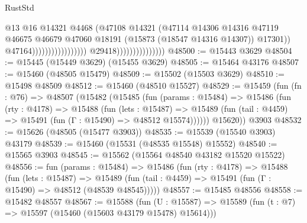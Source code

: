 \begin{lexlean}{RustStd}
\begin{coremodule}
                                                                    @13
                                                                    @16
                                                                    @14321
                                                                    @4468
                                                                    (@47108
                                                                      @14321
                                                                      (@47114
                                                                        @14306
                                                                        @14316
                                                                        @47119
                                                                        @46675
                                                                        @46679
                                                                        @47060
                                                                        @18191
                                                                        (@15873
                                                                          (@18547 @14316 @14307))
                                                                        @17301))
                                                                    @47164)))))))))))))))))
                                  @29418)))))))))))))))
@48500 := @15443 @3629
@48504 := @15445 (@15449 @3629) (@15455 @3629)
@48505 := @15464 @43176
@48507 := @15460 (@48505 @15479)
@48509 := @15502 (@15503 @3629)
@48510 := @15498 @48509
@48512 := @15460 (@48510 @15527)
@48529 := @15459
    (fun (fn : @76) =>
    @48507
      (@15482
        (@15485
          (fun (params : @15484) =>
          @15486
            (fun (rty : @4178) =>
            @15488
              (fun (lets : @15487) =>
              @15489 (fun (tail : @4459) => @15491 (fun (Γ : @15490) => @48512 @15574))))))
        @15620))
    @3903
@48532 := @15626 (@48505 (@15477 @3903))
@48535 := @15539 (@15540 @3903) @43179
@48539 := @15460 (@15531 (@48535 @15548) @15552)
@48540 := @15565 @3903
@48545 := @15562 (@15564 @48540 @43182 @15520 @15522)
@48556 := fun (params : @15484) =>
  @15486
    (fun (rty : @4178) =>
    @15488
      (fun (lets : @15487) =>
      @15489 (fun (tail : @4459) => @15491 (fun (Γ : @15490) => @48512 (@48539 @48545)))))
@48557 := @15485 @48556
@48558 := @15482 @48557
@48567 := @15588
    (fun (U : @15587) => @15589 (fun (t : @7) => @15597 (@15460 (@15603 @43179 @15478) @15614)))

\end{coremodule}
\end{lexlean}
